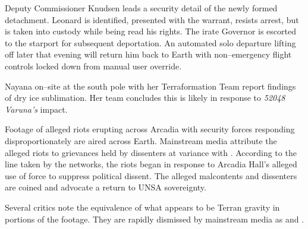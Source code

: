 Deputy Commissioner Knudsen leads a security detail of the newly formed detachment. Leonard is identified, presented with the warrant, resists arrest, but is taken into custody while being read his rights. The irate Governor is escorted to the starport for subsequent deportation. An automated solo departure lifting off later that evening will return him back to Earth with non--emergency flight controls locked down from manual user override.
\StopTimelineDate

Nayana on--site at the south pole with her Terraformation Team report findings of dry ice sublimation. Her team concludes this is likely in response to {\it 52048 Varuna's} impact.
\StopTimelineDate

Footage of alleged riots erupting across Arcadia with security forces responding disproportionately are aired across Earth. Mainstream media attribute the alleged riots to grievances held by dissenters at variance with . According to the line taken by the networks, the riots began in response to Arcadia Hall's alleged use of force to suppress political dissent. The alleged malcontents and dissenters are coined  and advocate a return to UNSA sovereignty.

Several critics note the equivalence of what appears to be Terran gravity in portions of the footage. They are rapidly dismissed by mainstream media as  and .
\StopTimelineDate

